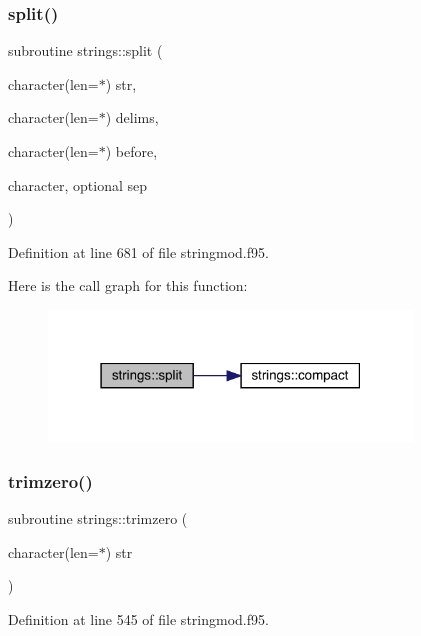 \subsubsection{\texorpdfstring{split()}{split()}}
{\footnotesize\ttfamily subroutine strings\+::split (\begin{DoxyParamCaption}\item[{character(len=$\ast$)}]{str,  }\item[{character(len=$\ast$)}]{delims,  }\item[{character(len=$\ast$)}]{before,  }\item[{character, optional}]{sep }\end{DoxyParamCaption})}



Definition at line 681 of file stringmod.\+f95.

Here is the call graph for this function\+:\nopagebreak
\begin{figure}[H]
\begin{center}
\leavevmode
\includegraphics[width=274pt]{namespacestrings_a12ec697adfa3201deadb7777456db11c_cgraph}
\end{center}
\end{figure}
\mbox{\label{namespacestrings_a18777b9741e00afdfe3ec5f5fa16ca46}} 
\subsubsection{\texorpdfstring{trimzero()}{trimzero()}}
{\footnotesize\ttfamily subroutine strings\+::trimzero (\begin{DoxyParamCaption}\item[{character(len=$\ast$)}]{str }\end{DoxyParamCaption})}



Definition at line 545 of file stringmod.\+f95.

\mbox{\label{namespacestrings_a9e805cff1c9339d9c7e7d10808a97e62}} 
